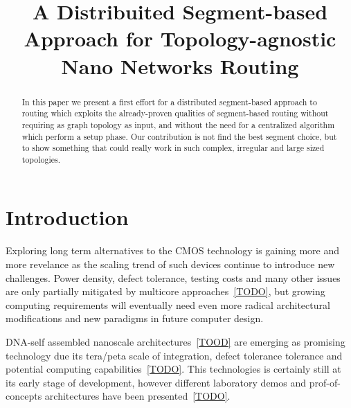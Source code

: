 \documentclass[conference]{IEEEtran}
\begin{document}

\title{A Distribuited Segment-based Approach for Topology-agnostic Nano Networks Routing} 

\author{
    \and
    }

\maketitle


\begin{abstract}
In this paper we present a first effort for a distributed
segment-based approach to routing which exploits the already-proven
qualities of segment-based routing without requiring as graph topology
as input, and without the need for a centralized algorithm which
perform a setup phase.  Our contribution is not find the
best segment choice, but to show something that could really work in
such complex, irregular and large sized topologies.
\end{abstract}




\section{Introduction}
Exploring long term alternatives to the CMOS technology is gaining
more and more revelance as the scaling trend of such devices continue
to introduce new challenges. Power density, defect tolerance, testing
costs and many other issues are only partially mitigated by multicore
approaches~\ref{TODO}, but growing computing requirements will eventually need
even more radical architectural modifications and new paradigms in
future computer design.

DNA-self assembled nanoscale architectures~\ref{TOOD} are emerging as promising
technology due its tera/peta scale of integration, defect tolerance
tolerance and potential computing capabilities~\ref{TODO}. This
technologies is certainly still at its early stage of development,
however different laboratory demos and prof-of-concepts architectures
have been presented~\ref{TODO}.
\end{document}
